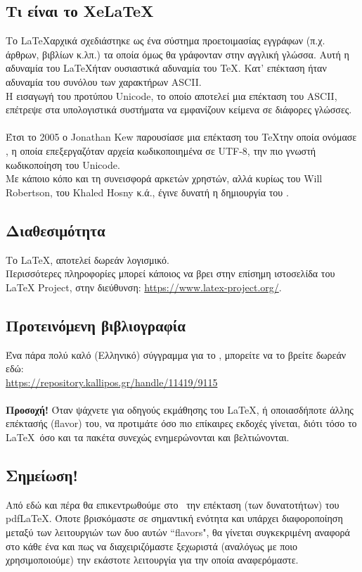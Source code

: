 \documentclass[a4paper, 12pt, oneside, xelatex, final]{article}
\begin{document}
	\subsection{Τι είναι το XeLaTeX}
	\noindent Το \LaTeX αρχικά σχεδιάστηκε ως ένα σύστημα προετοιμασίας εγγράφων (π.χ. άρθρων, βιβλίων κ.λπ.) τα οποία όμως θα γράφονταν στην αγγλική γλώσσα. Αυτή η αδυναμία του \LaTeX ήταν ουσιαστικά αδυναμία του \TeX. Κατ' επέκταση ήταν αδυναμία του συνόλου των χαρακτήρων ASCII.\\
	Η εισαγωγή του προτύπου Unicode, το οποίο αποτελεί μια επέκταση του ASCII, επέτρεψε στα υπολογιστικά συστήματα να εμφανίζουν κείμενα σε διάφορες γλώσσες.\\
	\\
	Έτσι το 2005 ο Jonathan Kew παρουσίασε μια επέκταση του \TeX την οποία ονόμασε \XeLaTeX, η οποία επεξεργαζόταν αρχεία κωδικοποιημένα σε UTF-8, την πιο γνωστή κωδικοποίηση του Unicode.\\
	Με κάποιο κόπο και τη συνεισφορά αρκετών χρηστών, αλλά κυρίως του Will Robertson, του Khaled Hosny κ.ά., έγινε δυνατή η δημιουργία του \XeLaTeX.
	
	\subsection{Διαθεσιμότητα}
	\noindent Το \LaTeX, αποτελεί δωρεάν λογισμικό.\\
	Περισσότερες πληροφορίες μπορεί κάποιος να βρει στην επίσημη ιστοσελίδα του LaTeX Project, στην διεύθυνση: \url{https://www.latex-project.org/}.
			
	\subsection{Προτεινόμενη βιβλιογραφία}
	\noindent Ένα πάρα πολύ καλό (Ελληνικό) σύγγραμμα για το \XeLaTeX, μπορείτε να το βρείτε δωρεάν εδώ:\\
	\url{https://repository.kallipos.gr/handle/11419/9115}\\ \\
	\textbf{Προσοχή!} Όταν ψάχνετε για οδηγούς εκμάθησης του \LaTeX, ή οποιασδήποτε άλλης επέκτασής (flavor) του, να προτιμάτε όσο πιο επίκαιρες εκδοχές γίνεται, διότι τόσο το \LaTeX\ όσο και τα πακέτα συνεχώς ενημερώνονται και βελτιώνονται.
	
	\subsection*{Σημείωση!}
	\noindent Από εδώ και πέρα θα επικεντρωθούμε στο \XeLaTeX\ την επέκταση (των δυνατοτήτων) του pdf\LaTeX. Όποτε βρισκόμαστε σε σημαντική ενότητα και υπάρχει διαφοροποίηση μεταξύ των λειτουργιών των δυο αυτών ``flavors", θα γίνεται συγκεκριμένη αναφορά στο κάθε ένα και πως να διαχειριζόμαστε ξεχωριστά (αναλόγως με ποιο χρησιμοποιούμε) την εκάστοτε λειτουργία για την οποία αναφερόμαστε.
	
\end{document}
